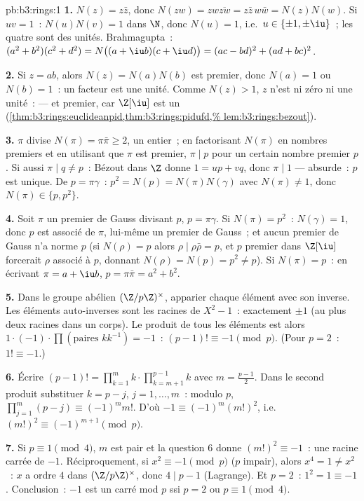\begin{solution}{pb:b3:rings:1}
\textbf{1.} $N(z) = z\bar z$, donc $N(zw) = zw\overline{zw} =
z\bar z\, w \bar w = N(z)N(w)$. Si $uv = 1$~: $N(u)N(v) = 1$ dans
$\N$, donc $N(u) = 1$, i.e.\ $u \in \{\pm 1, \pm \iu\}$~; les
quatre sont des unités. Brahmagupta~: $(a^2+b^2)(c^2+d^2) =
N\bigl((a + \iu b)(c + \iu d)\bigr) = (ac - bd)^2 + (ad +
bc)^2$.

\textbf{2.} Si $z = ab$, alors $N(z) = N(a)N(b)$ est premier,
donc $N(a) = 1$ ou $N(b) = 1$~: un facteur est une unité. Comme
$N(z) > 1$, $z$ n'est ni zéro ni une unité~:  --- et
premier, car $\Z[\iu]$ est un 
(\cref{thm:b3:rings:euclideanpid,thm:b3:rings:pidufd,%
lem:b3:rings:bezout}).

\textbf{3.} $\pi$ divise $N(\pi) = \pi\bar\pi \geq 2$, un
entier~; en factorisant $N(\pi)$ en nombres premiers et en
utilisant que $\pi$ est premier, $\pi \mid p$ pour un certain
nombre premier $p$. Si aussi $\pi \mid q \neq p$~: Bézout dans
$\Z$ donne $1 = up + vq$, donc $\pi \mid 1$ --- absurde~: $p$
est unique. De $p = \pi\gamma$~: $p^2 = N(p) = N(\pi)N(\gamma)$
avec $N(\pi) \neq 1$, donc $N(\pi) \in \{p, p^2\}$.

\textbf{4.} Soit $\pi$ un premier de Gauss divisant $p$, $p =
\pi\gamma$. Si $N(\pi) = p^2$~: $N(\gamma) = 1$, donc $p$ est
associé de $\pi$, lui-même un premier de Gauss~; et aucun
premier de Gauss n'a norme $p$ (si $N(\rho) = p$ alors $\rho
\mid \rho\bar\rho = p$, et $p$ premier dans $\Z[\iu]$ forcerait
$\rho$ associé à $p$, donnant $N(\rho) = N(p) = p^2 \neq p$).
Si $N(\pi) = p$~: en écrivant $\pi = a + \iu b$, $p =
\pi\bar\pi = a^2 + b^2$.

\textbf{5.} Dans le groupe abélien $(\Z/p\Z)^\times$, apparier
chaque élément avec son inverse. Les éléments auto-inverses sont
les racines de $X^2 - 1$~: exactement $\pm 1$ (au plus deux
racines dans un corps). Le produit de tous les éléments est alors
$1 \cdot (-1) \cdot \prod (\text{paires } k k^{-1}) = -1$~:
$(p-1)! \equiv -1 \pmod p$. (Pour $p = 2$~: $1! \equiv -1$.)

\textbf{6.} Écrire $(p-1)! = \prod_{k=1}^m k \cdot
\prod_{k=m+1}^{p-1}k$ avec $m = \frac{p-1}2$. Dans le second
produit substituer $k = p - j$, $j = 1, \dots, m$~: modulo $p$,
$\prod_{j=1}^m (p - j) \equiv (-1)^m m!$. D'où $-1 \equiv
(-1)^m (m!)^2$, i.e.\ $(m!)^2 \equiv (-1)^{m+1} \pmod p$.

\textbf{7.} Si $p \equiv 1 \pmod 4$, $m$ est pair et la question
6 donne $(m!)^2 \equiv -1$~: une racine carrée de $-1$.
Réciproquement, si $x^2 \equiv -1 \pmod p$ ($p$ impair), alors
$x^4 = 1 \neq x^2$~: $x$ a ordre $4$ dans $(\Z/p\Z)^\times$,
donc $4 \mid p - 1$ (Lagrange). Et $p = 2$~: $1^2 = 1 \equiv
-1$. Conclusion~: $-1$ est un carré mod $p$ ssi $p = 2$ ou $p
\equiv 1 \pmod 4$.


\end{solution}
